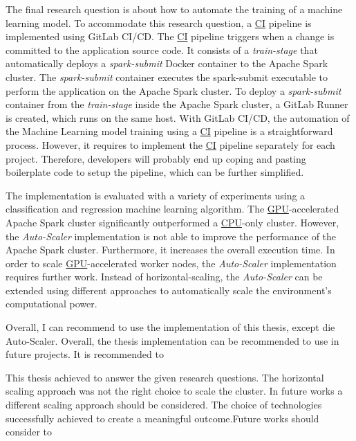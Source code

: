 The final research question is about how to automate the training of a machine learning model.
%
To accommodate this research question, a \hyperlink{abbr:ci}{CI} pipeline is implemented using GitLab CI/CD. The \hyperlink{abbr:ci}{CI} pipeline triggers when a change is committed to the application source code.
It consists of a \textit{train-stage} that automatically deploys a \textit{spark-submit} Docker container to the Apache Spark cluster.
The \textit{spark-submit} container executes the spark-submit executable to perform the application on the Apache Spark cluster.
To deploy a \textit{spark-submit} container from the \textit{train-stage} inside the Apache Spark cluster, a GitLab Runner is created, which runs on the same host.
With GitLab CI/CD, the automation of the Machine Learning model training using a \hyperlink{abbr:ci}{CI} pipeline is a straightforward process. However, it requires to implement the \hyperlink{abbr:ci}{CI} pipeline separately for each project. Therefore, developers will probably end up coping and pasting boilerplate code to setup the pipeline, which can be further simplified.


The implementation is evaluated with a variety of experiments using a classification and regression machine learning algorithm.
The \hyperlink{abbr:gpu}{GPU}-accelerated Apache Spark cluster significantly outperformed a \hyperlink{abbr:cpu}{CPU}-only cluster.
However, the \textit{Auto-Scaler} implementation is not able to improve the performance of the Apache Spark cluster. Furthermore, it increases the overall execution time. In order to scale \hyperlink{abbr:gpu}{GPU}-accelerated worker nodes, the \textit{Auto-Scaler} implementation requires further work. Instead of horizontal-scaling, the \textit{Auto-Scaler} can be extended using different approaches to automatically scale the environment's computational power.


Overall, I can recommend to use the implementation of this thesis, except die Auto-Scaler.
Overall, the thesis implementation can be recommended to use in future projects.
%
It is recommended to 

This thesis achieved to answer the given research questions. The horizontal scaling approach was not the right choice to scale the cluster. In future works a different scaling approach should be considered. The choice of technologies successfully achieved to create a meaningful outcome.Future works should consider to 


